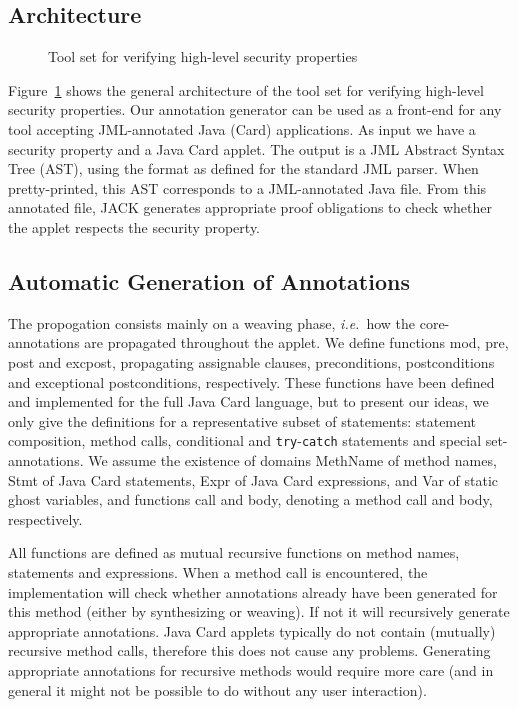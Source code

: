 \subsection{Architecture}

\begin{figure}[pht]
\begin{center}
\end{center}
\caption{\sc Tool set for verifying high-level security properties}\label{FigArch}
\end{figure}



Figure~\ref{FigArch} shows the general architecture of the tool set
for verifying high-level security properties. Our annotation generator
can be used as a front-end for any tool accepting JML-annotated Java
(Card) applications. As input we have a security property and a Java
Card applet. The output is a JML Abstract Syntax Tree (AST), using the
format as defined for the standard JML parser. When pretty-printed,
this AST corresponds to a JML-annotated Java file. From this
annotated file, JACK generates appropriate proof obligations to check
whether the applet respects the security property.

\subsection{Automatic Generation of Annotations}

The propogation consists mainly on a weaving phase,
\emph{i.e.}~how the core-annotations are propagated throughout the
applet. We define functions \textsf{mod}, \textsf{pre}, \textsf{post} and
\textsf{exc\-post}, propagating assignable clauses, preconditions, 
postconditions and exceptional postconditions, respectively. These
functions have been defined and implemented for the full Java Card
language, but to present our ideas, we only give the definitions for a
representative subset of statements: statement composition, method
calls, conditional and \texttt{try}-\texttt{catch} statements and
special set-annotations. We assume the existence of domains
\textsf{MethName} of method names, \textsf{Stmt} of Java Card
statements, \textsf{Expr} of Java Card expressions, and \textsf{Var}
of static ghost variables, and functions
\textsf{call} and \textsf{body}, denoting a method call and 
body, respectively.

All functions are defined as mutual recursive functions on method
names, statements and expressions. When a method call is encountered,
the implementation will check whether annotations already have been
generated for this method (either by synthesizing or weaving). If not
it will recursively generate appropriate annotations. Java Card
applets typically do not contain (mutually) recursive method calls,
therefore this does not cause any problems. Generating appropriate
annotations for recursive methods would require more care (and in
general it might not be possible to do without any user interaction).

